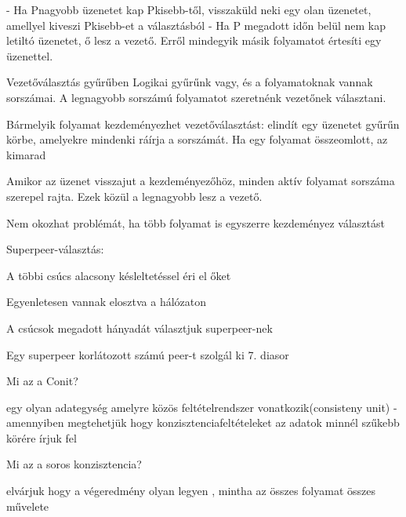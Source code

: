 \documentclass[12pt]{article}
\begin{document}
\begin{description}
                                        - Ha Pnagyobb üzenetet kap Pkisebb-től, visszaküld neki egy olan üzenetet, amellyel kiveszi Pkisebb-et a választásból
                                        - Ha P megadott időn belül nem kap letiltó üzenetet, ő lesz a vezető. Erről mindegyik másik folyamatot értesíti egy üzenettel.
                                    \item  Vezetőválasztás gyűrűben
                                        Logikai gyűrűnk vagy, és a folyamatoknak vannak sorszámai. A legnagyobb sorszámú folyamatot szeretnénk vezetőnek választani.
                                    \item Bármelyik folyamat kezdeményezhet vezetőválasztást: elindít egy üzenetet gyűrűn körbe, amelyekre mindenki ráírja a sorszámát.
                                        Ha egy folyamat összeomlott, az kimarad
                                    \item Amikor az üzenet visszajut a kezdeményezőhöz, minden aktív folyamat sorszáma szerepel rajta. Ezek közül a legnagyobb lesz a vezető.
                                    \item Nem okozhat problémát, ha több folyamat is egyszerre kezdeményez választást	
                                    \item  Superpeer-választás:
                                    \item A többi csúcs alacsony késleltetéssel éri el őket
                                    \item Egyenletesen vannak elosztva a hálózaton
                                    \item A csúcsok megadott hányadát választjuk superpeer-nek
                                    \item Egy superpeer korlátozott számú peer-t szolgál ki
                                        7. diasor
                                    \item  Mi az a Conit?
                                    \item egy olyan adategység amelyre közös feltételrendszer vonatkozik(consisteny unit)
                                        - amennyiben megtehetjük hogy konzisztenciafeltételeket az adatok minnél szűkebb körére írjuk fel
                                    \item  Mi az a soros konzisztencia?
                                    \item elvárjuk hogy a végeredmény olyan legyen , mintha az összes folyamat összes művelete

\end{description}
\end{document}
